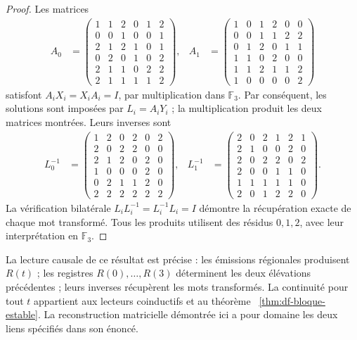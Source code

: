 \begin{proof}
Les matrices
\begin{align*}
 A_0&=\begin{pmatrix}
1&1&2&0&1&2\\0&0&1&0&0&1\\2&1&2&1&0&1\\
0&2&0&1&0&2\\2&1&1&0&2&2\\2&1&1&1&1&2
\end{pmatrix},&
 A_1&=\begin{pmatrix}
1&0&1&2&0&0\\0&0&1&1&2&2\\0&1&2&0&1&1\\
1&1&0&2&0&0\\1&1&2&1&1&2\\1&0&0&0&0&2
\end{pmatrix}
\end{align*}
satisfont \(A_iX_i=X_iA_i=I\), par multiplication dans \(\mathbb F_3\).
Par conséquent, les solutions sont imposées par \(L_i=A_iY_i\) ; la
multiplication produit les deux matrices montrées. Leurs inverses sont
\begin{align*}
 L_0^{-1}&=\begin{pmatrix}
1&2&0&2&0&2\\2&0&2&2&0&0\\2&1&2&0&2&0\\
1&0&0&0&2&0\\0&2&1&1&2&0\\2&2&2&2&2&2
\end{pmatrix},&
 L_1^{-1}&=\begin{pmatrix}
2&0&2&1&2&1\\2&1&0&0&2&0\\2&0&2&2&0&2\\
2&0&0&1&1&0\\1&1&1&1&1&0\\2&0&1&2&2&0
\end{pmatrix}.
\end{align*}
La vérification bilatérale \(L_iL_i^{-1}=L_i^{-1}L_i=I\) démontre la
récupération exacte de chaque mot transformé. Tous les produits
utilisent des résidus \(0,1,2\), avec leur interprétation en \(\mathbb F_3\).
\end{proof}

La lecture causale de ce résultat est précise : les émissions régionales produisent \(R(t)\) ; les registres \(R(0),\ldots,R(3)\) déterminent les deux élévations précédentes ; leurs inverses récupèrent les mots transformés.  
La continuité pour tout \(t\) appartient aux lecteurs coinductifs et au théorème ~\ref{thm:df-bloque-estable}. La reconstruction matricielle démontrée ici a pour domaine les deux liens spécifiés dans son énoncé.

